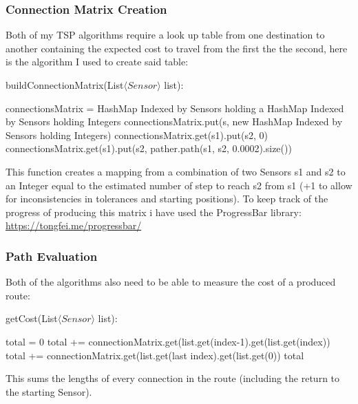 \documentclass[12pt]{article}
\begin{document}
\subsubsection{Connection Matrix Creation}
Both of my TSP algorithms require a look up table from one destination to another containing the expected cost to travel from the first the the second, here is the algorithm I used to create said table:
\begin{algorithm}
\caption{buildConnectionMatrix(List$\langle Sensor \rangle$ list):}
\begin{algorithmic}[1]
 \STATE connectionsMatrix = HashMap Indexed by Sensors holding a HashMap Indexed by Sensors holding Integers
 \STATE connectionsMatrix.put(s, new HashMap Indexed by Sensors holding Integers)
 \ENDFOR
 \STATE connectionsMatrix.get(s1).put(s2, 0)
 \ELSE
 \STATE connectionsMatrix.get(s1).put(s2, pather.path(s1, s2, 0.0002).size())
 \ENDIF
 \ENDFOR
 \ENDFOR
\end{algorithmic}
\end{algorithm}
This function creates a mapping from a combination of two Sensors s1 and s2 to an Integer equal to the estimated number of step to reach s2 from s1 (+1 to allow for inconsistencies in tolerances and starting positions). \newline
To keep track of the progress of producing this matrix i have used the ProgressBar library: \url{https://tongfei.me/progressbar/}
\subsubsection{Path Evaluation}
Both of the algorithms also need to be able to measure the cost of a produced route:
\begin{algorithm}
\caption{getCost(List$\langle Sensor \rangle$ list):}
\begin{algorithmic}
 \STATE total = 0
 \STATE total += connectionMatrix.get(list.get(index-1).get(list.get(index))
 \ENDFOR
 \STATE total += connectionMatrix.get(list.get(last index).get(list.get(0))
 \RETURN total
\end{algorithmic}
\end{algorithm}
This sums the lengths of every connection in the route (including the return to the starting Sensor).
\newpage
\end{document}
